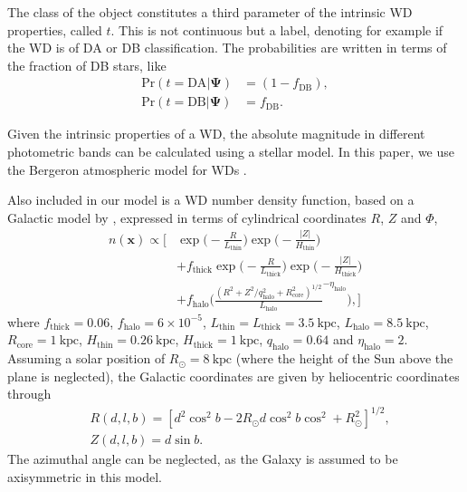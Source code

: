 \documentclass[fleqn,usenatbib]{mnras}
\newcommand{\popp}{\boldsymbol{\Psi}}
\newcommand{\pr}{\text{Pr}}
\newcommand{\kpc}{\text{kpc}}
\begin{document}
The class of the object constitutes a third parameter of the intrinsic WD properties, called $t$. This is not continuous but a label, denoting for example if the WD is of DA or DB classification. The probabilities are written in terms of the fraction of DB stars, like
\begin{equation}\label{eq:DADB}
\begin{split}
	\pr(t=\text{DA} | \popp) & = (1-f_\text{DB}),\\
    \pr(t=\text{DB} | \popp) & = f_\text{DB}.
\end{split}
\end{equation}

Given the intrinsic properties of a WD, the absolute magnitude in different photometric bands can be calculated using a stellar model. In this paper, we use the Bergeron atmospheric model for WDs \citep{Bergeron:1995we,Finley:1997zz,Bergeron:2000ce,2001PASP..113..409F}.

Also included in our model is a WD number density function, based on a Galactic model by \cite{2008ApJ...673..864J}, expressed in terms of cylindrical coordinates $R$, $Z$ and $\Phi$,
\begin{equation}\label{eq:numberdensity}
\begin{split}
	n(\mathbf{x}) \propto
	\Bigg[ 
		& \exp\Bigg(-\frac{R}{L_\text{thin}}\Bigg)\exp\Bigg(-\frac{|Z|}{H_\text{thin}}\Bigg) \\
		& +f_\text{thick}\exp\Bigg(-\frac{R}{L_\text{thick}}\Bigg)\exp\Bigg(-\frac{|Z|}{H_\text{thick}}\Bigg) \\
		& +f_\text{halo}\Bigg( \frac{(R^2+Z^2/q_\text{halo}^2+R_\text{core}^2)^{1/2}}{L_\text{halo}}^{-\eta_\text{halo}} \Bigg),
	\Bigg]
\end{split}
\end{equation}
where $f_\text{thick}=0.06$, $f_\text{halo}=6\times10^{-5}$, $L_\text{thin}=L_\text{thick}=3.5~\kpc$, $L_\text{halo}=8.5~\kpc$, $R_\text{core}=1~\kpc$, $H_\text{thin}=0.26~\kpc$, $H_\text{thick}=1~\kpc$, $q_\text{halo}=0.64$ and $\eta_\text{halo} = 2$. Assuming a solar position of $R_\odot=8~\kpc$ (where the height of the Sun above the plane is neglected), the Galactic coordinates are given by heliocentric coordinates through
\begin{equation}
\begin{split}
	& R(d,l,b) = [d^2\cos^2b-2 R_\odot d \cos^2b\cos^2+R_\odot^2]^{1/2}, \\
	& Z(d,l,b) = d \sin b.
\end{split}
\end{equation}
The azimuthal angle can be neglected, as the Galaxy is assumed to be axisymmetric in this model.
\end{document}
